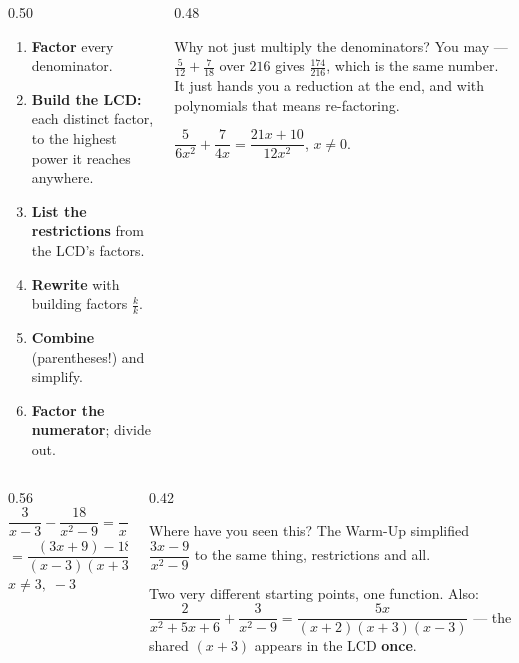 \documentclass[aspectratio=169, 11pt]{beamer}
\begin{document}
\begin{frame}[t, plain]
  \begin{columns}[T]
    \begin{column}{0.50\textwidth}
      \begin{enumerate}\setlength{\itemsep}{3pt}
        \item \textbf{Factor} every denominator.
        \item \textbf{Build the LCD:} each distinct factor, to the highest power it reaches anywhere.
        \item \textbf{List the restrictions} from the LCD's factors.
        \item \textbf{Rewrite} with building factors $\frac kk$.
        \item \textbf{Combine} (parentheses!) and simplify.
        \item \textbf{Factor the numerator}; divide out.
      \end{enumerate}
    \end{column}
    \begin{column}{0.48\textwidth}
      \begin{block}{Why not just multiply the denominators?}
        You may --- $\frac{5}{12}+\frac{7}{18}$ over $216$ gives $\frac{174}{216}$, which is the same
        number. It just hands you a reduction at the end, and with polynomials that means
        re-factoring.
      \end{block}
      \vspace{3pt}
      {\footnotesize $\dfrac{5}{6x^2}+\dfrac{7}{4x}=\dfrac{21x+10}{12x^2}$, \; $x\neq0$.}
    \end{column}
  \end{columns}
\end{frame}

\begin{frame}[t, plain]
  \begin{columns}[T]
    \begin{column}{0.56\textwidth}
      \[ \frac{3}{x-3}-\frac{18}{x^2-9}
         =\frac{3}{x-3}\cdot\frac{x+3}{x+3}-\frac{18}{(x-3)(x+3)} \]
      \[ =\frac{(3x+9)-18}{(x-3)(x+3)}=\frac{3(x-3)}{(x-3)(x+3)}=\frac{3}{x+3} \]
      \centering $x\neq3,\;-3$
    \end{column}
    \begin{column}{0.42\textwidth}
      \begin{block}{Where have you seen this?}
        The Warm-Up simplified $\dfrac{3x-9}{x^2-9}$ to the same thing, restrictions and all.
      \end{block}
      \vspace{3pt}
      {\footnotesize Two very different starting points, one function. Also:
      $\dfrac{2}{x^2+5x+6}+\dfrac{3}{x^2-9}=\dfrac{5x}{(x+2)(x+3)(x-3)}$ --- the shared $(x+3)$ appears
      in the LCD \textbf{once}.}
    \end{column}
  \end{columns}
\end{frame}
\end{document}
